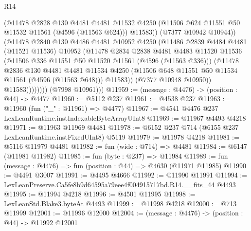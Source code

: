 \begin{lexlean}{R14}
\begin{coremodule}
                          (@11478
                            @2828
                            @130
                            @4481
                            @4481
                            @11532
                            @4250
                            (@11506 @624 @11551 @50 @11532 @11561 (@4596 (@11563 @624)))
                            @11583))
                        (@7377 @10942 @10944))
                      (@11478
                        @2840
                        @130
                        @4486
                        @4481
                        @10952
                        @4250
                        (@11486
                          @2839
                          @4484
                          @4481
                          (@11521 @11536)
                          @10952
                          (@11478
                            @2834
                            @2838
                            @4481
                            @4483
                            @11520
                            @11536
                            (@11506 @336 @11551 @50 @11520 @11561 (@4596 (@11563 @336)))
                            (@11478
                              @2836
                              @130
                              @4481
                              @4481
                              @11534
                              @4250
                              (@11506 @648 @11551 @50 @11534 @11561 (@4596 (@11563 @648)))
                              @11583))
                          (@7377 @10948 @10950))
                        @11583))))))))
        (@7998 @10961)))
@11959 := (message : @4476) -> (position : @44) -> @4477
@11960 := @5112 @237
@11961 := @4538 @237
@11963 := @11960 (fun ("_" : @11961) => @4477)
@11967 := @4541 @4476 @237 LexLeanRuntime.instIndexableByteArrayUInt8
@11969 := @11967 @4493 @4218
@11971 := @11963 @11969 @4481
@11978 := @6152 @237 @714 (@6155 @237 LexLeanRuntime.instFixedUInt8) @5119
@11979 := @11978 @4218
@11981 := @5116 @11979 @4481
@11982 := fun (wide : @714) => @4481
@11984 := @6147 (@11981 @11982)
@11985 := fun (byte : @237) => @11984
@11989 := fun (message : @4476) => fun (position : @44) => @4630 (@11971 @11985)
@11990 := @4491 @3007
@11991 := @4495 @4666
@11992 := @11990 @11991
@11994 := LexLeanPreserve.Ca5fe8b9d64595a79eee4f004915717bd.R14.__fits_44 @4493
@11995 := @11994 @4218
@11996 := @4501 @11995
@11998 := LexLeanStd.Blake3.byteAt @4493
@11999 := @11998 @4218
@12000 := @713 @11999
@12001 := @11996 @12000
@12004 := (message : @4476) -> (position : @44) -> @11992 @12001

\end{coremodule}
\end{lexlean}
